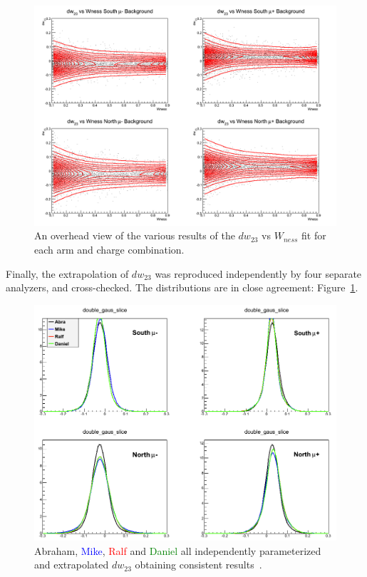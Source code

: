 \begin{figure}
  \centering
  \includegraphics[width=\linewidth]{./figures/c_WnessVsdw23.png}
  \caption{
    An overhead view of the various results of the $dw_{23}$ vs $W_{ness}$ fit
    for each arm and charge combination.
  }
\end{figure}

Finally, the extrapolation of $dw_{23}$ was reproduced independently by four
separate analyzers, and cross-checked. The distributions are in close
agreement: Figure~\ref{fig:four_dw23}.

\begin{figure}
  \centering
  \includegraphics[width=0.7\linewidth]{./figures/dw23_fourway.png}
  \caption{
    Abraham, \textcolor{blue}{Mike}, \textcolor{red}{Ralf} and
    \textcolor{green}{Daniel} all independently parameterized and extrapolated
    $dw_{23}$ obtaining consistent results~\cite{Seidl2014a}.
  }
  \label{fig:four_dw23}
\end{figure}


